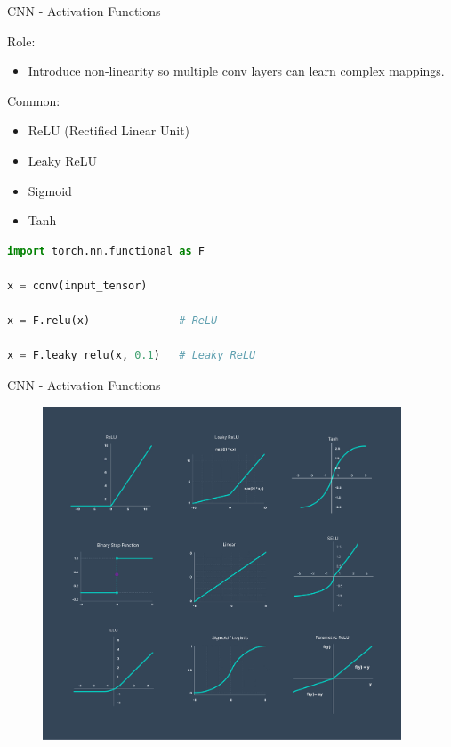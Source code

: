 \begin{frame}[fragile]{CNN - Activation Functions}
\begin{block}{Role:}
    \begin{itemize}
        \item Introduce non‑linearity so multiple conv layers can learn complex mappings.
    \end{itemize}
\end{block}

\begin{block}{Common:}
    \begin{itemize}
        \item ReLU (Rectified Linear Unit)
        \item Leaky ReLU
        \item Sigmoid
        \item Tanh
    \end{itemize}
\end{block}

\begin{lstlisting}[language=Python, caption={Code snippet (PyTorch)}]
import torch.nn.functional as F

x = conv(input_tensor)

x = F.relu(x)              # ReLU

x = F.leaky_relu(x, 0.1)   # Leaky ReLU
\end{lstlisting}
\end{frame}  

\begin{frame}{CNN - Activation Functions}
    \begin{figure}
    \centering
    \includegraphics[width=0.95\textwidth,height=0.95\textheight,keepaspectratio]{images/activation-functions.png}
    \end{figure}
\end{frame}